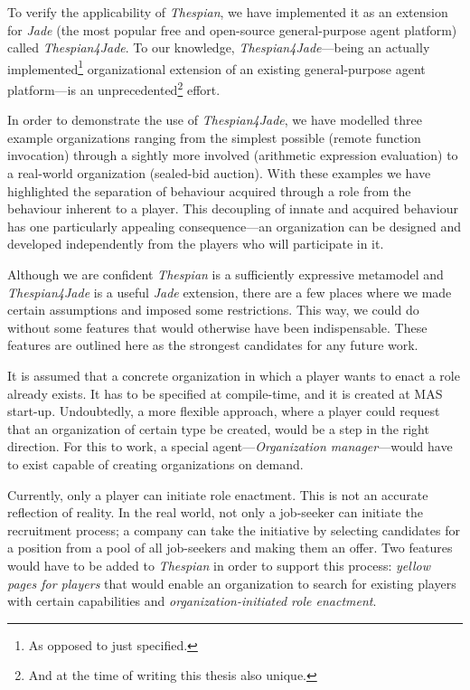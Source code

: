 To verify the applicability of \textit{Thespian}, we have implemented it as an extension for \textit{Jade} (the most popular free and open-source general-purpose agent platform) called \textit{Thespian4Jade}.
To our knowledge, \textit{Thespian4Jade}---being an actually implemented\footnote{As opposed to just specified.} organizational extension of an existing general-purpose agent platform---is an unprecedented\footnote{And at the time of writing this thesis also unique.} effort.

In order to demonstrate the use of \textit{Thespian4Jade}, we have modelled three example organizations ranging from the simplest possible (remote function invocation) through a sightly more involved (arithmetic expression evaluation) to a real-world organization (sealed-bid auction).
With these examples we have highlighted the separation of behaviour acquired through a role from the behaviour inherent to a player.
This decoupling of innate and acquired behaviour has one particularly appealing consequence---an organization can be designed and developed independently from the players who will participate in it. 


Although we are confident \textit{Thespian} is a sufficiently expressive metamodel and \textit{Thespian4Jade} is a useful \textit{Jade} extension, there are a few places where we made certain assumptions and imposed some restrictions.
This way, we could do without some features that would otherwise have been indispensable.
These features are outlined here as the strongest candidates for any future work.

It is assumed that a concrete organization in which a player wants to enact a role already exists.
It has to be specified at compile-time, and it is created at MAS start-up.
Undoubtedly, a more flexible approach, where a player could request that an organization of certain type be created, would be a step in the right direction.
For this to work, a special agent---\textit{Organization manager}---would have to exist capable of creating organizations on demand.

Currently, only a player can initiate role enactment.
This is not an accurate reflection of reality.
In the real world, not only a job-seeker can initiate the recruitment process; a company can take the initiative by selecting candidates for a position from a pool of all job-seekers and making them an offer.
Two features would have to be added to \textit{Thespian} in order to support this process: \textit{yellow pages for players} that would enable an organization to search for existing players with certain capabilities and \textit{organization-initiated role enactment}.

